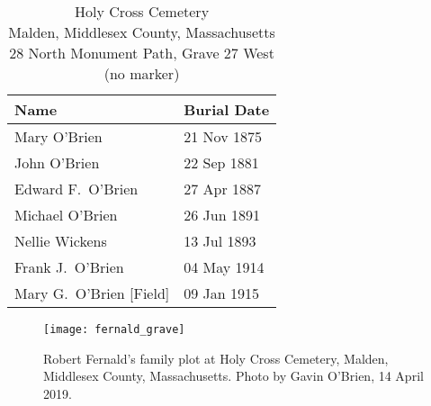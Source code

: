 \begin{table}[ht]
	\centering
	\caption{Holy Cross Cemetery\cite{HolyCrossPlotMichael} \\
		Malden, Middlesex County, Massachusetts
		28 North Monument Path, Grave 27 West (no marker)}
	\begin{tabular}{|l|l|}
		\hline
		\textbf{Name} & \textbf{Burial Date} \\
		\hline
		Mary O'Brien\index{O'Brien!Mary\textsuperscript{3} (1875--1875)} & 21 Nov 1875 \\
		\hline
		John O'Brien\index{O'Brien!John Joseph\textsuperscript{3} (1876--1881)} & 22 Sep 1881 \\
		\hline
		Edward F.\ O'Brien\index{O'Brien!Edward William\textsuperscript{4} (1884--1887)} & 27 Apr 1887 \\
		\hline
		Michael O'Brien\index{O'Brien!Michael\textsuperscript{2}} & 26 Jun 1891 \\
		\hline
		Nellie Wickens\index{Wickens!Nellie\textsuperscript{4}} & 13 Jul 1893 \\
		\hline
		Frank J.\ O'Brien\index{O'Brien!Francis Joseph\textsuperscript{3}} & 04 May 1914 \\
		\hline
		Mary G.\ O'Brien [Field]\index{Field!Mary}\index{O'Brien!Mary (Field)} & 09 Jan 1915 \\
		\hline
	\end{tabular}
\end{table}

\begin{figure}
	\centering
	\texttt{[image: fernald\_grave]}
	\caption{Robert Fernald's family plot at Holy Cross Cemetery, Malden, Middlesex County, Massachusetts. Photo by Gavin O'Brien, 14 April 2019.}
\end{figure}

